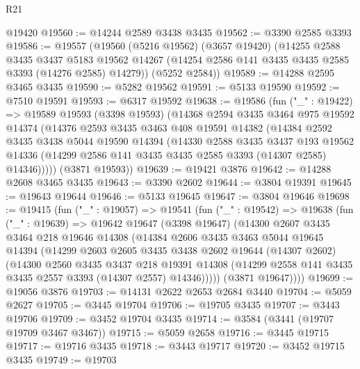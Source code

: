 \begin{lexlean}{R21}
\begin{coremodule}
    @19420
@19560 := @14244 @2589 @3438 @3435
@19562 := @3390 @2585 @3393
@19586 := @19557
    (@19560
      (@5216 @19562)
      (@3657 @19420)
      (@14255
        @2588
        @3435
        @3437
        @5183
        @19562
        @14267
        (@14254 @2586 @141 @3435 @3435 @2585 @3393 (@14276 @2585) @14279))
      (@5252 @2584))
@19589 := @14288 @2595 @3465 @3435
@19590 := @5282 @19562
@19591 := @5133 @19590
@19592 := @7510 @19591
@19593 := @6317 @19592
@19638 := @19586
    (fun ("_" : @19422) =>
    @19589
      @19593
      (@3398 @19593)
      (@14368
        @2594
        @3435
        @3464
        @975
        @19592
        @14374
        (@14376
          @2593
          @3435
          @3463
          @408
          @19591
          @14382
          (@14384
            @2592
            @3435
            @3438
            @5044
            @19590
            @14394
            (@14330
              @2588
              @3435
              @3437
              @193
              @19562
              @14336
              (@14299 @2586 @141 @3435 @3435 @2585 @3393 (@14307 @2585) @14346)))))
      (@3871 @19593))
@19639 := @19421 @3876
@19642 := @14288 @2608 @3465 @3435
@19643 := @3390 @2602
@19644 := @3804 @19391
@19645 := @19643 @19644
@19646 := @5133 @19645
@19647 := @3804 @19646
@19698 := @19415
    (fun ("_" : @19057) =>
    @19541
      (fun ("_" : @19542) =>
      @19638
        (fun ("_" : @19639) =>
        @19642
          @19647
          (@3398 @19647)
          (@14300
            @2607
            @3435
            @3464
            @218
            @19646
            @14308
            (@14384
              @2606
              @3435
              @3463
              @5044
              @19645
              @14394
              (@14299
                @2603
                @2605
                @3435
                @3438
                @2602
                @19644
                (@14307 @2602)
                (@14300
                  @2560
                  @3435
                  @3437
                  @218
                  @19391
                  @14308
                  (@14299 @2558 @141 @3435 @3435 @2557 @3393 (@14307 @2557) @14346)))))
          (@3871 @19647))))
@19699 := @19056 @3876
@19703 := @14131 @2622 @2653 @2684 @3440
@19704 := @5059 @2627
@19705 := @3445 @19704
@19706 := @19705 @3435
@19707 := @3443 @19706
@19709 := @3452 @19704 @3435
@19714 := @3584 (@3441 (@19707 @19709 @3467 @3467))
@19715 := @5059 @2658
@19716 := @3445 @19715
@19717 := @19716 @3435
@19718 := @3443 @19717
@19720 := @3452 @19715 @3435
@19749 := @19703

\end{coremodule}
\end{lexlean}
